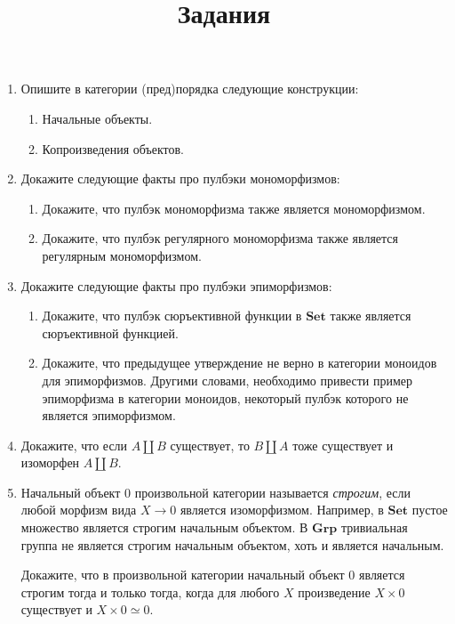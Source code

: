 \documentclass[draft]{article}
\newcommand{\cat}[1]{\mathbf{#1}}
\newcommand{\Set}{\cat{Set}}
\newcommand{\Grp}{\cat{Grp}}
\begin{document}
\title{Задания}
\maketitle

\begin{enumerate}

\item Опишите в категории (пред)порядка следующие конструкции:
\begin{enumerate}
\item Начальные объекты.
\item Копроизведения объектов.
\end{enumerate}

\item Докажите следующие факты про пулбэки мономорфизмов:
\begin{enumerate}
\item Докажите, что пулбэк мономорфизма также является мономорфизмом.
\item Докажите, что пулбэк регулярного мономорфизма также является регулярным мономорфизмом.
\end{enumerate}

\item Докажите следующие факты про пулбэки эпиморфизмов:
\begin{enumerate}
\item Докажите, что пулбэк сюръективной функции в $\Set$ также является сюръективной функцией.
\item Докажите, что предыдущее утверждение не верно в категории моноидов для эпиморфизмов. Другими словами, необходимо привести пример эпиморфизма в категории моноидов, некоторый пулбэк которого не является эпиморфизмом.
\end{enumerate}

\item Докажите, что если $A \amalg B$ существует, то $B \amalg A$ тоже существует и изоморфен $A \amalg B$.

\item Начальный объект $0$ произвольной категории называется \emph{строгим}, если любой морфизм вида $X \to 0$ является изоморфизмом.
Например, в $\Set$ пустое множество является строгим начальным объектом.
В $\Grp$ тривиальная группа не является строгим начальным объектом, хоть и является начальным.

Докажите, что в произвольной категории начальный объект $0$ является строгим тогда и только тогда, когда для любого $X$ произведение $X \times 0$ существует и $X \times 0 \simeq 0$.


\end{enumerate}
\end{document}
